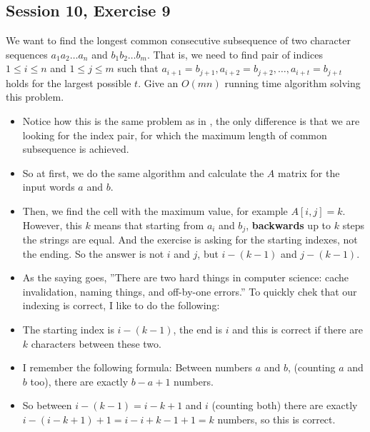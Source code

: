 \subsection {Session 10, Exercise 9}

\label{session_10_exercise_9}


We want to find the longest common consecutive subsequence of two character sequences $a_1a_2 \dots{} a_n$ and
$b_1b_2 \dots{} b_m$. That is, we need to find pair of indices $1 \leq{} i \leq{} n$ and $1 \leq{} j \leq{} m$ such that $a_{i+1} = b_{j+1}, a_{i+2} = b_{j+2}, \dots{}, a_{i+t} = b_{j+t}$ holds for the largest possible $t$. Give an  $O(mn)$ running time algorithm solving this problem.


\begin{itemize}
    \item Notice how this is the same problem as in , the only difference is that we are looking for the index pair, for which the maximum length of common subsequence is achieved.
    \item So at first, we do the same algorithm and calculate the $A$ matrix for the input words $a$ and $b$.
    \item Then, we find the cell with the maximum value, for example $A[i,j] = k$. However, this $k$ means that starting from $a_i$ and $b_j$, \textbf{backwards} up to $k$ steps the strings are equal. And the exercise is asking for the starting indexes, not the ending. So the answer is not $i$ and $j$, but $i-(k-1)$ and $j-(k-1)$.
    \item As the saying goes, ''There are two hard things in computer science: cache invalidation, naming things, and off-by-one errors.'' To quickly chek that our indexing is correct, I like to do the following:
    \item The starting index is $i-(k-1)$, the end is $i$ and this is correct if there are $k$ characters between these two.
    \item I remember the following formula: Between numbers $a$ and $b$, (counting $a$ and $b$ too), there are exactly $b-a+1$ numbers.
    \item So between $i-(k-1)=i-k+1$ and $i$ (counting both) there are exactly $i-(i-k+1)+1=i-i+k-1+1=k$ numbers, so this is correct.
\end{itemize}